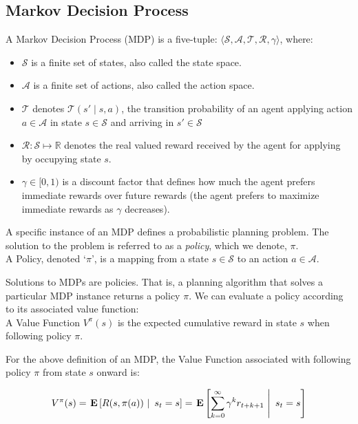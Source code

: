 \documentclass[11pt]{article}
\begin{document}
\subsection{Markov Decision Process}
{ A \textup{Markov Decision Process (MDP)} is a five-tuple: $\langle \mathcal{S},
\mathcal{A}, \mathcal{T}, \mathcal{R}, \gamma \rangle$, where:
\begin{itemize}
\item $\mathcal{S}$ is a finite set of states, also called the \textup{state space}.
\item $\mathcal{A}$ is a finite set of actions, also called the \textup{action space}.
\item $\mathcal{T}$ denotes $\mathcal{T}(s' \mid s,a)$, the
transition probability of an agent applying action $a \in \mathcal{A}$
in state $s \in \mathcal{S}$ and arriving in $s' \in \mathcal{S}$
\item $\mathcal{R} : \mathcal{S}\mapsto \mathbb{R}$ denotes the real valued reward received by the agent for
applying by occupying state $s$.
\item $\gamma \in [0, 1)$ is a discount factor that defines how much the
  agent prefers immediate rewards over future rewards (the agent
  prefers to maximize immediate rewards as $\gamma$ decreases).
\end{itemize}}

A specific instance of an MDP defines a probabilistic planning problem. The solution to the problem is referred to as a {\it policy}, which we denote, $\pi$. \\

{ A \textup{Policy}, denoted `$\pi$', is a mapping from a state $s \in \mathcal{S}$ to an action $a \in \mathcal{A}$.}

Solutions to MDPs are policies. That is, a planning algorithm that solves a particular MDP instance returns a policy $\pi$. We can evaluate a policy according to its associated value function: \\

{ A \textup{Value Function} $V^\pi(s)$ is the expected cumulative reward in state $s$ when following policy $\pi$.}

For the above definition of an MDP, the Value Function associated with following policy $\pi$ from state $s$ onward is:

\begin{equation}
V^\pi(s) = \left.\E{R(s,\pi(a))\ \right|\ s_t = s} = \left.\E{\sum_{k=0}^\infty \gamma^k r_{t+k+1}\ \right|\ s_t = s}
\end{equation}
\end{document}
